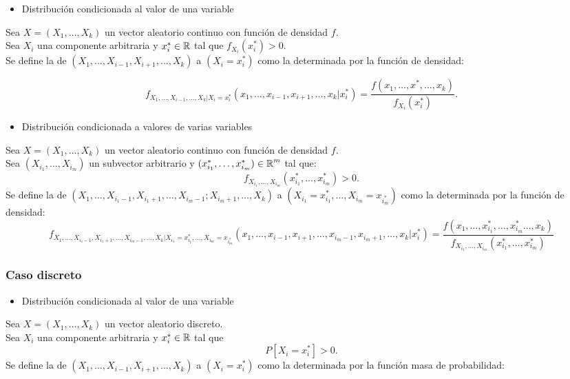 \begin{itemize}[label=\color{red}\textbullet, leftmargin=*]
	\item \color{lightblue}Distribución condicionada al valor de una variable
\end{itemize}

Sea $X=(X_1,\dots,X_k)$ un vector aleatorio continuo con función de densidad $f$.\\
Sea $X_i$ una componente arbitraria y $x_i^*\in\operatorname{\mathbb{R}}$ tal que $f_{X_i}(x_i^*)>0$.\\
Se define la  de $(X_1,\dots,X_{i-1},X_{i+1},\dots,X_k)$ a $(X_i=x_i^*)$ como la determinada por la función de densidad:

\[ f_{X_1,\dots,X_{i-1},\dots,X_k|X_i=x_i^*}(x_1,\dots,x_{i-1},x_{i+1},\dots,x_k|x_i^*)=\dfrac{f(x_1,\dots,x^*,\dots,x_k)}{f_{X_i}(x_i^*)}. \]


\begin{itemize}[label=\color{red}\textbullet, leftmargin=*]
	\item \color{lightblue}Distribución condicionada a valores de varias variables
\end{itemize}
Sea $X=(X_1,\dots,X_k)$ un vector aleatorio continuo con función de densidad $f$.\\
Sea $(X_{i_1},\dots,X_{i_m})$ un subvector arbitrario y $(x_{i_1}^{*},\dots,x_{i_m}^*)\in\operatorname{\mathbb{R}}^m$ tal que: \[ f_{X_{i_1},\dots,X_{i_m}}(x_{i_1}^*,\dots,x_{i_m}^*)>0. \]
Se define la  de $(X_1,\dots,X_{i_{1}-1},X_{i_1+1},\dots,X_{i_m-1};X_{i_m+1},\dots,X_k)$ a $(X_{i_1}=x_{i_1}^*,\dots,X_{i_m}=x_{i_m^*})$ como la determinada por la función de densidad:
\[ f_{X_1,\dots,X_{i_{1}-1},X_{i_1+1},\dots,X_{i_m-1},\dots,X_k|X_{i_1}=x_{i_1}^*,\dots,X_{i_m}=x_{i_m^*}}(x_1,\dots,x_{i-1},x_{i+1},\dots,x_{i_m-1},x_{i_m+1},\dots,x_k|x_i^*)=\dfrac{f(x_1,\dots,x_{i_1}^*,\dots,x_{i_m}^*\dots,x_k)}{f_{X_{i_1},\dots,X_{i_m}}(x_{i_1}^*,\dots,x_{i_m}^*)} \]
\subsubsection{Caso discreto}
\begin{itemize}[label=\color{red}\textbullet, leftmargin=*]
	\item \color{lightblue}Distribución condicionada al valor de una variable
\end{itemize}
Sea $X=(X_1,\dots,X_k)$ un vector aleatorio discreto.\\
Sea $X_i$ una componente arbitraria y $x_i^*\in\operatorname{\mathbb{R}}$ tal que \[ P[X_i=x_i^*]>0. \]
Se define la  de $(X_1,\dots,X_{i-1},X_{i+1},\dots,X_k)$ a $(X_i=x_i^*)$ como la determinada por la función masa de probabilidad:

